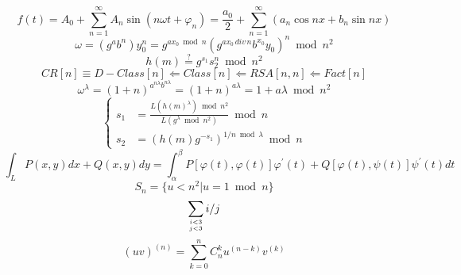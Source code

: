 \documentclass[UTF8]{ctexart}
\begin{document}
$$f(t)=A_{0}+\sum_{n=1}^{\infty}A_{n}\sin(n\omega t +\varphi_{n})=\frac{a_{0}}{2}+\sum_{n=1}^{\infty}(a_{n}\cos nx+b_{n}\sin nx)$$
$$\omega = (g^{a}b^{n})y_{0}^{n}=g^{ax_{0} \bmod n}(g^{ax_{0}\, div\, n}b^{x_{0}}y_{0})^{n} \bmod n^{2}$$
$$h(m)\overset{?}{=}g^{s_{1}}s_{2}^{n} \bmod n^{2}$$
$$CR[n]\equiv D-Class[n]\Leftarrow Class[n] \Leftarrow RSA[n,n] \Leftarrow Fact[n]$$
$$\omega^{\lambda} = (1+n)^{a^{n\lambda}b^{n\lambda}} = (1+n)^{a\lambda} =1+a\lambda \bmod n^{2}$$
$$\left\{
\begin{aligned}
s_{1}& = \frac{L(h(m)^{\lambda}) \bmod n^{2}}{L(g^{\lambda} \bmod n^{2})} \bmod n \\
s_{2}& = (h(m)g^{-s_{1}})^{1/n \bmod \lambda} \bmod n
\end{aligned}
\right.$$
$$\int_{L}P(x,y)dx+Q(x,y)dy=\int^{\beta}_{\alpha}P[\varphi(t),\varphi(t)] \varphi^{'}(t) + Q[\varphi(t),\psi(t)]\psi^{'}(t)dt $$
$$S_{n} = \{{u<n^2|u = 1 \bmod n}\}$$
$$\sum_{{i<3}\atop{j<3}}i/j$$
$$(uv)^{(n)}=\sum_{k=0}^{n}C_{n}^{k}u^{(n-k)}v^{(k)}$$
\end{document}
